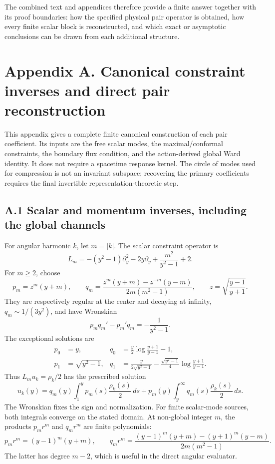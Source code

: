 The combined text and appendices therefore provide a finite answer together with its proof boundaries: how the specified physical pair operator is obtained, how every finite scalar block is reconstructed, and which exact or asymptotic conclusions can be drawn from each additional structure.

\clearpage
\hypertarget{appendix-a.-canonical-constraint-inverses-and-direct-pair-reconstruction}{%
\section{Appendix A. Canonical constraint inverses and direct pair reconstruction}\label{appendix-a.-canonical-constraint-inverses-and-direct-pair-reconstruction}}

This appendix gives a complete finite canonical construction of each pair coefficient. Its inputs are the free scalar modes, the maximal/conformal constraints, the boundary flux condition, and the action-derived global Ward identity. It does not require a spacetime response kernel. The circle of modes used for compression is not an invariant subspace; recovering the primary coefficients requires the final invertible representation-theoretic step.

\hypertarget{a.1-scalar-and-momentum-inverses-including-the-global-channels}{%
\subsection{A.1 Scalar and momentum inverses, including the global channels}\label{a.1-scalar-and-momentum-inverses-including-the-global-channels}}

For angular harmonic \(k\), let \(m=|k|\). The scalar constraint operator is \[
L_m=-(y^2-1)\partial_y^2-2y\partial_y+\frac{m^2}{y^2-1}+2 .
\tag{A.1}
\] For \(m\ge2\), choose \[
p_m=z^m(y+m),\qquad
q_m=\frac{z^m(y+m)-z^{-m}(y-m)}{2m(m^2-1)},
\qquad z=\sqrt{\frac{y-1}{y+1}}.
\tag{A.2}
\] They are respectively regular at the center and decaying at infinity, \(q_m\sim1/(3y^2)\), and have Wronskian \[
p_mq_m'-p_m'q_m=-\frac1{y^2-1}.
\] The exceptional solutions are \[
\begin{aligned}
p_0&=y,&q_0&=\frac y2\log\frac{y+1}{y-1}-1,\\
p_1&=\sqrt{y^2-1},&
q_1&=\frac{y}{2\sqrt{y^2-1}}
-\frac{\sqrt{y^2-1}}4\log\frac{y+1}{y-1}.
\end{aligned}
\tag{A.3}
\] Thus \(L_mu_k=\rho_k/2\) has the prescribed solution \[
u_k(y)=q_m(y)\int_1^y p_m(s)\frac{\rho_k(s)}2\,ds
+p_m(y)\int_y^\infty q_m(s)\frac{\rho_k(s)}2\,ds.
\tag{A.4}
\] The Wronskian fixes the sign and normalization. For finite scalar-mode sources, both integrals converge on the stated domain. At non-global integer \(m\), the products \(p_mr^m\) and \(q_mr^m\) are finite polynomials: \[
p_mr^m=(y-1)^m(y+m),\qquad
q_mr^m=\frac{(y-1)^m(y+m)-(y+1)^m(y-m)}
{2m(m^2-1)}.
\tag{A.5}
\] The latter has degree \(m-2\), which is useful in the direct angular evaluator.

